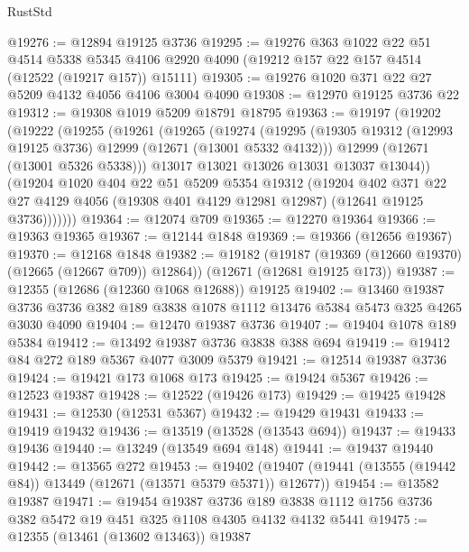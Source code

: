 \begin{lexlean}{RustStd}
\begin{coremodule}
@19276 := @12894 @19125 @3736
@19295 := @19276
    @363
    @1022
    @22
    @51
    @4514
    @5338
    @5345
    @4106
    @2920
    @4090
    (@19212 @157 @22 @157 @4514 (@12522 (@19217 @157)) @15111)
@19305 := @19276 @1020 @371 @22 @27 @5209 @4132 @4056 @4106 @3004 @4090
@19308 := @12970 @19125 @3736 @22
@19312 := @19308 @1019 @5209 @18791 @18795
@19363 := @19197
    (@19202
      (@19222
        (@19255
          (@19261
            (@19265
              (@19274
                (@19295
                  (@19305 @19312 (@12993 @19125 @3736) @12999 (@12671 (@13001 @5332 @4132)))
                  @12999
                  (@12671 (@13001 @5326 @5338)))
                @13017
                @13021
                @13026
                @13031
                @13037
                @13044))
            (@19204
              @1020
              @404
              @22
              @51
              @5209
              @5354
              @19312
              (@19204
                @402
                @371
                @22
                @27
                @4129
                @4056
                (@19308 @401 @4129 @12981 @12987)
                (@12641 @19125 @3736)))))))
@19364 := @12074 @709
@19365 := @12270 @19364
@19366 := @19363 @19365
@19367 := @12144 @1848
@19369 := @19366 (@12656 @19367)
@19370 := @12168 @1848
@19382 := @19182
    (@19187 (@19369 (@12660 @19370) (@12665 (@12667 @709)) @12864))
    (@12671 (@12681 @19125 @173))
@19387 := @12355 (@12686 (@12360 @1068 @12688)) @19125
@19402 := @13460
    @19387
    @3736
    @3736
    @382
    @189
    @3838
    @1078
    @1112
    @13476
    @5384
    @5473
    @325
    @4265
    @3030
    @4090
@19404 := @12470 @19387 @3736
@19407 := @19404 @1078 @189 @5384
@19412 := @13492 @19387 @3736 @3838 @388 @694
@19419 := @19412 @84 @272 @189 @5367 @4077 @3009 @5379
@19421 := @12514 @19387 @3736
@19424 := @19421 @173 @1068 @173
@19425 := @19424 @5367
@19426 := @12523 @19387
@19428 := @12522 (@19426 @173)
@19429 := @19425 @19428
@19431 := @12530 (@12531 @5367)
@19432 := @19429 @19431
@19433 := @19419 @19432
@19436 := @13519 (@13528 (@13543 @694))
@19437 := @19433 @19436
@19440 := @13249 (@13549 @694 @148)
@19441 := @19437 @19440
@19442 := @13565 @272
@19453 := @19402 (@19407 (@19441 (@13555 (@19442 @84)) @13449 (@12671 (@13571 @5379 @5371)) @12677))
@19454 := @13582 @19387
@19471 := @19454
    @19387
    @3736
    @189
    @3838
    @1112
    @1756
    @3736
    @382
    @5472
    @19
    @451
    @325
    @1108
    @4305
    @4132
    @4132
    @5441
@19475 := @12355 (@13461 (@13602 @13463)) @19387

\end{coremodule}
\end{lexlean}
